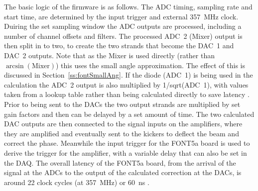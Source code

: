 The basic logic of the firmware is as follows. The ADC timing, sampling rate and start time, are determined by the input trigger and external 357~MHz clock. Duiring the set sampling window the ADC outputs are processed, including a number of channel offsets and filters. The processed ADC~2 (Mixer) output is then split in to two, to create the two strands that become the DAC~1 and DAC~2 outputs. Note that as the Mixer is used directly (rather than \(\arcsin(\mathrm{Mixer})\)) this uses the small angle approximation. The effect of this is discussed in Section~\ref{ss:fontSmallAng}. If the diode (ADC~1) is being used in the calculation the ADC~2 output is also multiplied by 1/sqrt(ADC~1), with values taken from a lookup table rather than being calculated directly to save latency \cite{glennCLIC13}. Prior to being sent to the DACs the two output strands are multiplied by set gain factors and then can be delayed by a set amount of time. The two calculated DAC outputs are then connected to the signal inputs on the amplifiers, where they are amplified and eventually sent to the kickers to deflect the beam and correct the phase. Meanwhile the input trigger for the FONT5a board is used to derive the trigger for the amplifier, with a variable delay that can also be set in the DAQ. The overall latency of the FONT5a board, from the arrival of the signal at the ADCs to the output of the calculated correction at the DACs, is around 22 clock cycles (at 357~MHz) or 60~ns \cite{glennCLIC14}.


